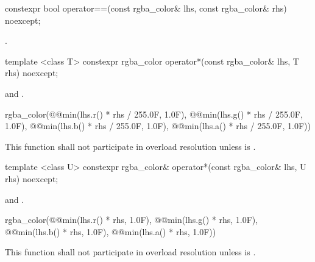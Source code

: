 %
\begin{itemdecl}
constexpr bool operator==(const rgba_color& lhs, const rgba_color& rhs) 
  noexcept;
\end{itemdecl}
\begin{itemdescr}
\pnum
\returns
{}.
\end{itemdescr}

%
\begin{itemdecl}
template <class T>
constexpr rgba_color operator*(const rgba_color& lhs, T rhs) noexcept;
\end{itemdecl}
\begin{itemdescr}
\pnum
\requires
{} and .

\pnum
\returns
\begin{codeblock}
rgba_color(@\stdqualifier{}@min(lhs.r() * rhs / 255.0F, 1.0F), 
  @\stdqualifier{}@min(lhs.g() * rhs / 255.0F, 1.0F),
  @\stdqualifier{}@min(lhs.b() * rhs / 255.0F, 1.0F), 
  @\stdqualifier{}@min(lhs.a() * rhs / 255.0F, 1.0F))
\end{codeblock}

\pnum
\remarks
This function shall not participate in overload resolution unless  is .
\end{itemdescr}

%
\begin{itemdecl}
template <class U>
constexpr rgba_color& operator*(const rgba_color& lhs, U rhs) noexcept;
\end{itemdecl}
\begin{itemdescr}
\pnum
\requires
{} and .

\pnum
\returns
\begin{codeblock}
rgba_color(@\stdqualifier{}@min(lhs.r() * rhs, 1.0F), 
  @\stdqualifier{}@min(lhs.g() * rhs, 1.0F),
  @\stdqualifier{}@min(lhs.b() * rhs, 1.0F),
  @\stdqualifier{}@min(lhs.a() * rhs, 1.0F))
\end{codeblock}

\pnum
\remarks
This function shall not participate in overload resolution unless  is .
\end{itemdescr}

